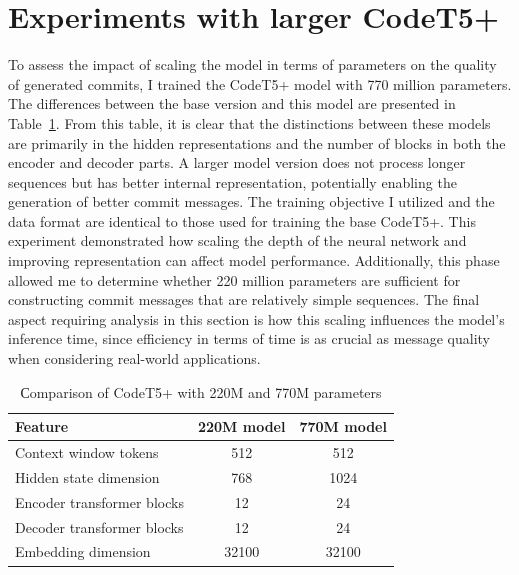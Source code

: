 \section[Larger model experiments]{Experiments with larger CodeT5+}\label{sec:larger_model_experiments}
To assess the impact of scaling the model in terms of parameters on the quality of generated commits, I trained the CodeT5+ model with 770 million parameters. The differences between the base version and this model are presented in Table~\ref{tab:220_vs_770_compare}. From this table, it is clear that the distinctions between these models are primarily in the hidden representations and the number of blocks in both the encoder and decoder parts. A larger model version does not process longer sequences but has better internal representation, potentially enabling the generation of better commit messages. The training objective I utilized and the data format are identical to those used for training the base CodeT5+. This experiment demonstrated how scaling the depth of the neural network and improving representation can affect model performance. Additionally, this phase allowed me to determine whether 220 million parameters are sufficient for constructing commit messages that are relatively simple sequences. The final aspect requiring analysis in this section is how this scaling influences the model's inference time, since efficiency in terms of time is as crucial as message quality when considering real-world applications.

\begin{table}[h]
    \centering
    \caption{Сomparison of CodeT5+ with 220M and 770M parameters}\label{tab:220_vs_770_compare}
    \renewcommand{\arraystretch}{1.5} %
    \begin{tabular}{|l|c|c|} %
    \hline %
    \textbf{Feature} & \textbf{220M model} & \textbf{770M model} \\ 
    \hline %
    Context window tokens       & 512 & 512 \\ \hline %
    Hidden state dimension       & 768 & 1024 \\ \hline %
    Encoder transformer blocks    & 12 & 24 \\ \hline %
    Decoder transformer blocks       & 12 & 24 \\ \hline %
    Embedding dimension       & 32100 & 32100 \\ \hline %
    \end{tabular}
\end{table}

